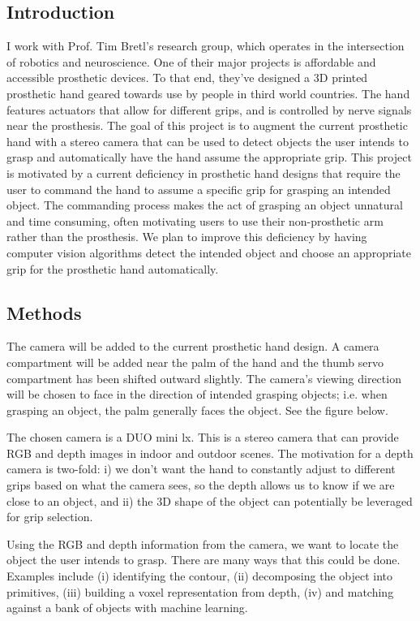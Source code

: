 \documentclass[12pt]{article}
\begin{document}
\subsection*{Introduction}
I work with Prof. Tim Bretl’s research group, which operates in the intersection
of robotics and neuroscience. One of their major projects is affordable and
accessible prosthetic devices. To that end, they’ve designed a 3D printed
prosthetic hand geared towards use by people in third world countries. The hand
features actuators that allow for different grips, and is controlled by nerve
signals near the prosthesis. The goal of this project is to augment the current
prosthetic hand with a stereo camera that can be used to detect objects the user
intends to grasp and automatically have the hand assume the appropriate grip.
This project is motivated by a current deficiency in prosthetic hand designs
that require the user to command the hand to assume a specific grip for grasping
an intended object. The commanding process makes the act of grasping an object
unnatural and time consuming, often motivating users to use their non-prosthetic
arm rather than the prosthesis. We plan to improve this deficiency by having
computer vision algorithms detect the intended object and choose an appropriate
grip for the prosthetic hand automatically.

\subsection*{Methods}
The camera will be added to the current prosthetic hand design. A camera
compartment will be added near the palm of the hand and the thumb servo
compartment has been shifted outward slightly. The camera’s viewing direction
will be chosen to face in the direction of intended grasping objects; i.e. when
grasping an object, the palm generally faces the object. See the figure below.
\newline

The chosen camera is a DUO mini lx. This is a stereo camera that can provide RGB
and depth images in indoor and outdoor scenes. The motivation for a depth camera
is two-fold: i) we don’t want the hand to constantly adjust to different grips
based on what the camera sees, so the depth allows us to know if we are close to
an object, and ii) the 3D shape of the object can potentially be leveraged for
grip selection. \newline

Using the RGB and depth information from the camera, we want to
locate the object the user intends to grasp. There are many ways that this could
be done. Examples include (i) identifying the contour, (ii) decomposing the
object into primitives, (iii) building a voxel representation from depth, (iv)
and matching against a bank of objects with machine learning. \newline
\end{document}
